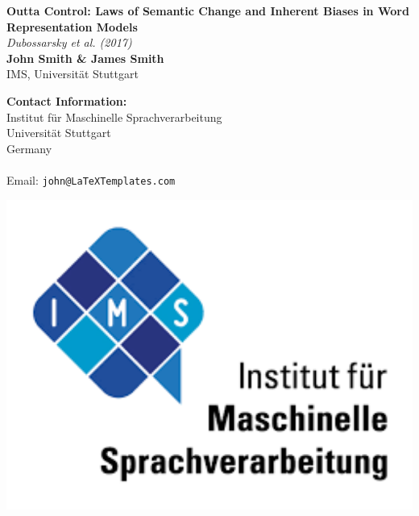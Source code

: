 \documentclass[a0,landscape]{a0poster}
\begin{document}



\begin{minipage}[b]{0.55\linewidth}
  \veryHuge \color{NavyBlue} \textbf{Outta Control: Laws of Semantic Change and Inherent Biases in Word Representation Models} \color{Black}\\ %
  \Huge \textit{Dubossarsky et al. (2017)}\\[1cm] %
  \huge \textbf{John Smith \& James Smith}\\ %
  \huge IMS, Universität Stuttgart \\ %
\end{minipage}
%
\begin{minipage}[b]{0.25\linewidth}
  \color{DarkSlateGray}\Large \textbf{Contact Information:}\\
  Institut für Maschinelle Sprachverarbeitung\\ %
  Universität Stuttgart\\
  Germany\\\\
  Email: \texttt{john@LaTeXTemplates.com}\\ %
\end{minipage}
%
\begin{minipage}[b]{0.19\linewidth}
  \includegraphics[width=20cm]{logo.png} %
\end{minipage}
\end{document}
